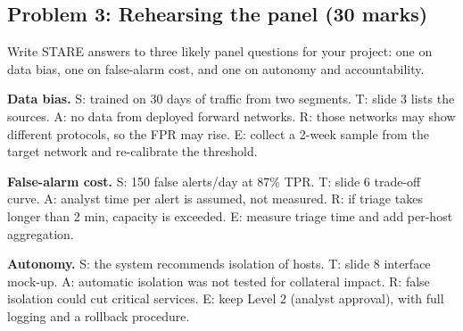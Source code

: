 \documentclass[11pt]{article}
\begin{document}
\subsection{Problem 3: Rehearsing the panel \normalfont\small\color{GreyN}(30 marks)}

\begin{prob}Write STARE answers to three likely panel questions for your project: one on data bias, one on false-alarm cost, and one on autonomy and accountability.\end{prob}

\begin{soln}\textbf{Data bias.} S: trained on 30 days of traffic from two segments. T: slide 3 lists the sources. A: no data from deployed forward networks. R: those networks may show different protocols, so the FPR may rise. E: collect a 2-week sample from the target network and re-calibrate the threshold.

\textbf{False-alarm cost.} S: 150 false alerts/day at 87\% TPR. T: slide 6 trade-off curve. A: analyst time per alert is assumed, not measured. R: if triage takes longer than 2 min, capacity is exceeded. E: measure triage time and add per-host aggregation.

\textbf{Autonomy.} S: the system recommends isolation of hosts. T: slide 8 interface mock-up. A: automatic isolation was not tested for collateral impact. R: false isolation could cut critical services. E: keep Level 2 (analyst approval), with full logging and a rollback procedure.\end{soln}
\end{document}

